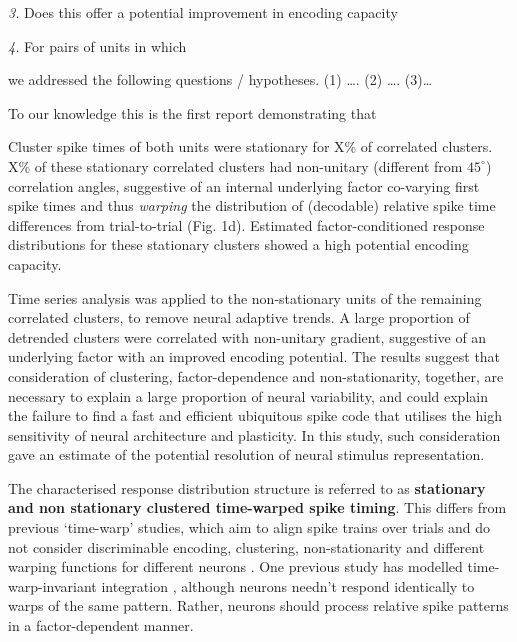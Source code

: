 \documentclass{article}
\begin{document}
\textit{3.} Does this offer a potential improvement in encoding capacity

\textit{4.} For pairs of units in which
    


we addressed the following questions / hypotheses. (1) …. (2) …. (3)…

To our knowledge this is the first report demonstrating that 


Cluster spike times of both units were stationary for X\% of correlated clusters. X\% of these stationary correlated clusters had non-unitary (different from $45^{\circ}$) correlation angles, suggestive of an internal underlying factor co-varying first spike times and thus \textit{warping} the distribution of (decodable) relative spike time differences from trial-to-trial (Fig. 1d). Estimated factor-conditioned response distributions for these stationary clusters showed a high potential encoding capacity. 

Time series analysis was applied to the non-stationary units of the remaining correlated clusters, to remove neural adaptive trends. A large proportion of detrended clusters were correlated with non-unitary gradient, suggestive of an underlying factor with an improved encoding potential. The results suggest that consideration of clustering, factor-dependence and non-stationarity, together, are necessary to explain a large proportion of neural variability, and could explain the failure to find a fast and efficient ubiquitous spike code that utilises the high sensitivity of neural architecture and plasticity. In this study, such consideration gave an estimate of the potential resolution of neural stimulus representation. 

The characterised response distribution structure is referred to as \textbf{stationary and non stationary clustered time-warped spike timing}. This differs from previous `time-warp' studies, which aim to align spike trains over trials and do not consider discriminable encoding, clustering, non-stationarity and different warping functions for different neurons \cite{williams2020discovering}. One previous study has modelled time-warp-invariant integration \cite{gutig2009time}, although neurons needn't respond identically to warps of the same pattern. Rather, neurons should process relative spike patterns in a factor-dependent manner.
\end{document}

